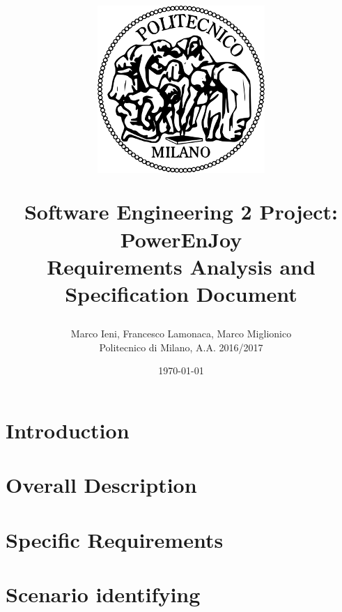 \documentclass[a4paper, 12pt]{report}
\title{
	\begin{figure}[h]
		\centering
		\includegraphics{../common_resources/logo_polimi.png}
	\end{figure}
	\vspace{30px}
	Software Engineering 2 Project: PowerEnJoy \\ \vspace{1em}
	\textbf{R}equirements \textbf{A}nalysis and \textbf{S}pecification \textbf{D}ocument
}
\author{Marco Ieni, Francesco Lamonaca, Marco Miglionico\\Politecnico di Milano, A.A. 2016/2017}
\date{\today}
\begin{document}
\maketitle
\tableofcontents

\chapter{Introduction}
\label{ch:introduction}










\chapter{Overall Description}
\label{ch:overall_description}







\chapter{Specific Requirements}
\label{ch:specific_requirements}





\chapter{Scenario identifying}

\end{document}
